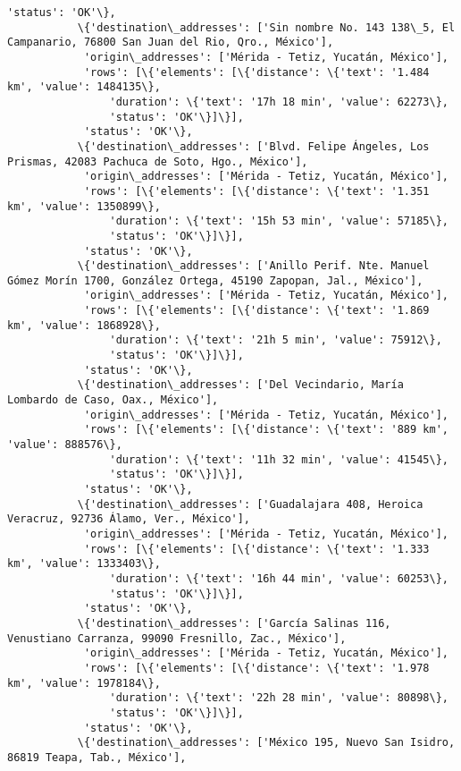 \documentclass[11pt]{article}
\begin{document}
\begin{Verbatim}[commandchars=\\\{\}]
            'status': 'OK'\},
           \{'destination\_addresses': ['Sin nombre No. 143 138\_5, El Campanario, 76800 San Juan del Rio, Qro., México'],
            'origin\_addresses': ['Mérida - Tetiz, Yucatán, México'],
            'rows': [\{'elements': [\{'distance': \{'text': '1.484 km', 'value': 1484135\},
                'duration': \{'text': '17h 18 min', 'value': 62273\},
                'status': 'OK'\}]\}],
            'status': 'OK'\},
           \{'destination\_addresses': ['Blvd. Felipe Ángeles, Los Prismas, 42083 Pachuca de Soto, Hgo., México'],
            'origin\_addresses': ['Mérida - Tetiz, Yucatán, México'],
            'rows': [\{'elements': [\{'distance': \{'text': '1.351 km', 'value': 1350899\},
                'duration': \{'text': '15h 53 min', 'value': 57185\},
                'status': 'OK'\}]\}],
            'status': 'OK'\},
           \{'destination\_addresses': ['Anillo Perif. Nte. Manuel Gómez Morín 1700, González Ortega, 45190 Zapopan, Jal., México'],
            'origin\_addresses': ['Mérida - Tetiz, Yucatán, México'],
            'rows': [\{'elements': [\{'distance': \{'text': '1.869 km', 'value': 1868928\},
                'duration': \{'text': '21h 5 min', 'value': 75912\},
                'status': 'OK'\}]\}],
            'status': 'OK'\},
           \{'destination\_addresses': ['Del Vecindario, María Lombardo de Caso, Oax., México'],
            'origin\_addresses': ['Mérida - Tetiz, Yucatán, México'],
            'rows': [\{'elements': [\{'distance': \{'text': '889 km', 'value': 888576\},
                'duration': \{'text': '11h 32 min', 'value': 41545\},
                'status': 'OK'\}]\}],
            'status': 'OK'\},
           \{'destination\_addresses': ['Guadalajara 408, Heroica Veracruz, 92736 Álamo, Ver., México'],
            'origin\_addresses': ['Mérida - Tetiz, Yucatán, México'],
            'rows': [\{'elements': [\{'distance': \{'text': '1.333 km', 'value': 1333403\},
                'duration': \{'text': '16h 44 min', 'value': 60253\},
                'status': 'OK'\}]\}],
            'status': 'OK'\},
           \{'destination\_addresses': ['García Salinas 116, Venustiano Carranza, 99090 Fresnillo, Zac., México'],
            'origin\_addresses': ['Mérida - Tetiz, Yucatán, México'],
            'rows': [\{'elements': [\{'distance': \{'text': '1.978 km', 'value': 1978184\},
                'duration': \{'text': '22h 28 min', 'value': 80898\},
                'status': 'OK'\}]\}],
            'status': 'OK'\},
           \{'destination\_addresses': ['México 195, Nuevo San Isidro, 86819 Teapa, Tab., México'],

\end{Verbatim}
\end{document}
